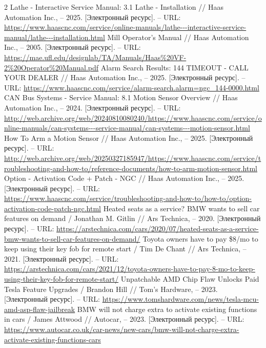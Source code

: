 \documentclass{article}
\begin{document}
\begin{thebibliography}{2}
 Lathe - Interactive Service Manual: 3.1 Lathe - Installation // Haas Automation Inc., – 2025. [Электронный ресурс]. – URL: \url{https://www.haascnc.com/service/online-manuals/lathe---interactive-service-manual/lathe---installation.html}
 Mill Operator’s Manual // Haas Automation Inc., – 2005. [Электронный ресурс]. – URL: \url{https://mae.ufl.edu/designlab/TA/Manuals/Haas%20VF-2%20Operator%20Manual.pdf}
 Alarm Search Results: 144 TIMEOUT - CALL YOUR DEALER // Haas Automation Inc., – 2025. [Электронный ресурс]. – URL: \url{https://www.haascnc.com/service/alarm-search.alarm=ngc_144-0000.html}
 CAN Bus Systems - Service Manual: 8.1 Motion Sensor Overview // Haas Automation Inc., – 2024. [Электронный ресурс]. – URL: \url{http://web.archive.org/web/20240810080240/https://www.haascnc.com/service/online-manuals/can-systems---service-manual/can-systems---motion-sensor.html}
 How To Arm a Motion Sensor // Haas Automation Inc., – 2025. [Электронный ресурс]. – URL: \url{http://web.archive.org/web/20250327185947/https://www.haascnc.com/service/troubleshooting-and-how-to/reference-documents/how-to-arm-motion-sensor.html}
 Option - Activation Code + Patch - NGC // Haas Automation Inc., – 2025. [Электронный ресурс]. – URL: \url{https://www.haascnc.com/service/troubleshooting-and-how-to/how-to/option-activation-code-patch-ngc.html}
 Heated seats as a service? BMW wants to sell car features on demand / Jonathan M. Gitlin // Ars Technica, – 2020. [Электронный ресурс]. – URL: \url{https://arstechnica.com/cars/2020/07/heated-seats-as-a-service-bmw-wants-to-sell-car-features-on-demand/}
 Toyota owners have to pay \$8/mo to keep using their key fob for remote start / Tim De Chant // Ars Technica, – 2021. [Электронный ресурс]. – URL: \url{https://arstechnica.com/cars/2021/12/toyota-owners-have-to-pay-8-mo-to-keep-using-their-key-fob-for-remote-start/}
 Unpatchable AMD Chip Flaw Unlocks Paid Tesla Feature Upgrades / Brandon Hill // Tom's Hardware, – 2023. [Электронный ресурс]. – URL: \url{https://www.tomshardware.com/news/tesla-mcu-amd-asp-flaw-jailbreak}
 BMW will not charge extra to activate existing functions in cars / James Attwood // Autocar, – 2023. [Электронный ресурс]. – URL: \url{https://www.autocar.co.uk/car-news/new-cars/bmw-will-not-charge-extra-activate-existing-functions-cars}

\end{thebibliography}
\end{document}
